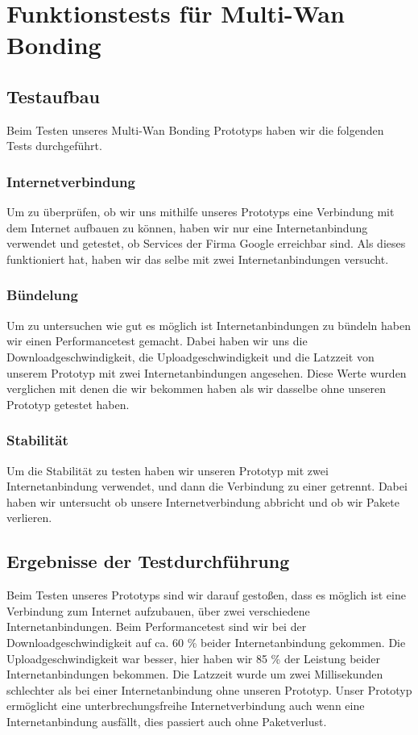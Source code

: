 \chapter{Funktionstests für Multi-Wan Bonding}
\label{cha:Funktionstests für Multi-Wan Bonding}

\section{Testaufbau}
Beim Testen unseres Multi-Wan Bonding Prototyps haben wir die folgenden Tests durchgeführt. 

\subsection{Internetverbindung}
Um zu überprüfen, ob wir uns mithilfe unseres Prototyps eine Verbindung mit dem Internet aufbauen zu können, haben wir nur eine Internetanbindung verwendet und getestet, ob Services der Firma Google erreichbar sind. Als dieses funktioniert hat, haben wir das selbe mit zwei Internetanbindungen versucht.

\subsection{Bündelung}
Um zu untersuchen wie gut es möglich ist Internetanbindungen zu bündeln haben wir einen Performancetest gemacht. Dabei haben wir uns die Downloadgeschwindigkeit, die Uploadgeschwindigkeit und die Latzzeit von unserem Prototyp mit zwei Internetanbindungen angesehen. Diese Werte wurden verglichen mit denen die wir bekommen haben als wir dasselbe ohne unseren Prototyp getestet haben. 

\subsection{Stabilität}
Um die Stabilität zu testen haben wir unseren Prototyp mit zwei Internetanbindung verwendet, und dann die Verbindung zu einer getrennt. Dabei haben wir untersucht ob unsere Internetverbindung abbricht und ob wir Pakete verlieren. 

\newpage

\section{Ergebnisse der Testdurchführung}
Beim Testen unseres Prototyps sind wir darauf gestoßen, dass es möglich ist eine Verbindung zum Internet aufzubauen, über zwei verschiedene Internetanbindungen. Beim Performancetest sind wir bei der Downloadgeschwindigkeit auf ca. 60 \% beider Internetanbindung gekommen. Die Uploadgeschwindigkeit war besser, hier haben wir 85 \% der Leistung beider Internetanbindungen bekommen. Die Latzzeit wurde um zwei Millisekunden schlechter als bei einer Internetanbindung ohne unseren Prototyp. Unser Prototyp ermöglicht eine unterbrechungsfreihe Internetverbindung auch wenn eine Internetanbindung ausfällt, dies passiert auch ohne Paketverlust.